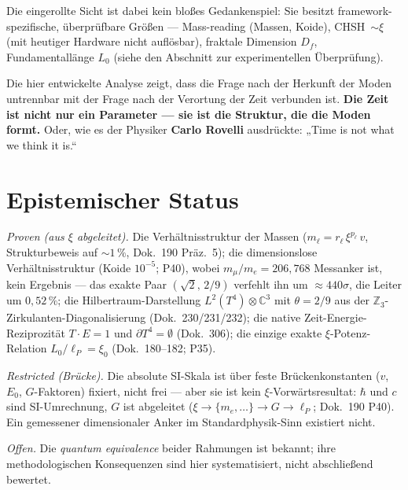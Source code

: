 Die eingerollte Sicht ist dabei kein bloßes Gedankenspiel: Sie besitzt framework-spezifische, überprüfbare Größen --- Mass-reading (Massen, Koide), CHSH~$\sim\xi$ (mit heutiger Hardware nicht auflösbar), fraktale Dimension $D_f$, Fundamentallänge $L_0$ (siehe den Abschnitt zur experimentellen \"Uberpr\"ufung).

Die hier entwickelte Analyse zeigt, dass die Frage nach der Herkunft der Moden untrennbar mit der Frage nach der Verortung der Zeit verbunden ist. \textbf{Die Zeit ist nicht nur ein Parameter --- sie ist die Struktur, die die Moden formt.} Oder, wie es der Physiker \textbf{Carlo Rovelli} ausdrückte: „Time is not what we think it is.``


\section{Epistemischer Status}

\emph{Proven (aus $\xi$ abgeleitet).} Die Verh\"altnisstruktur der Massen ($m_\ell=r_\ell\,\xi^{p_\ell}\,v$, Strukturbeweis auf ${\sim}1\,\%$, Dok.~190 Pr\"az.~5); die dimensionslose Verh\"altnisstruktur (Koide $10^{-5}$; P40), wobei $m_\mu/m_e=206{,}768$ Messanker ist, kein Ergebnis --- das exakte Paar $(\sqrt2,\,2/9)$ verfehlt ihn um ${\approx}440\sigma$, die Leiter um $0{,}52\,\%$; die Hilbertraum-Darstellung $L^2(T^4)\otimes\mathbb{C}^3$ mit $\theta=2/9$ aus der $\mathbb{Z}_3$-Zirkulanten-Diagonalisierung (Dok.~230/231/232); die native Zeit-Energie-Reziprozit\"at $T\cdot E=1$ und $\partial T^4=\emptyset$ (Dok.~306); die einzige exakte $\xi$-Potenz-Relation $L_0/\ell_P=\xi_0$ (Dok.~180--182; P35).

\emph{Restricted (Br\"ucke).} Die absolute SI-Skala ist \"uber feste Br\"uckenkonstanten ($v$, $E_0$, $G$-Faktoren) fixiert, nicht frei --- aber sie ist kein $\xi$-Vorw\"artsresultat: $\hbar$ und $c$ sind SI-Umrechnung, $G$ ist abgeleitet ($\xi\to\{m_e,\dots\}\to G\to\ell_P$; Dok.~190 P40). Ein gemessener dimensionaler Anker im Standardphysik-Sinn existiert nicht.

\emph{Offen.} Die \emph{quantum equivalence} beider Rahmungen ist bekannt; ihre methodologischen Konsequenzen sind hier systematisiert, nicht abschlie\ss{}end bewertet.
